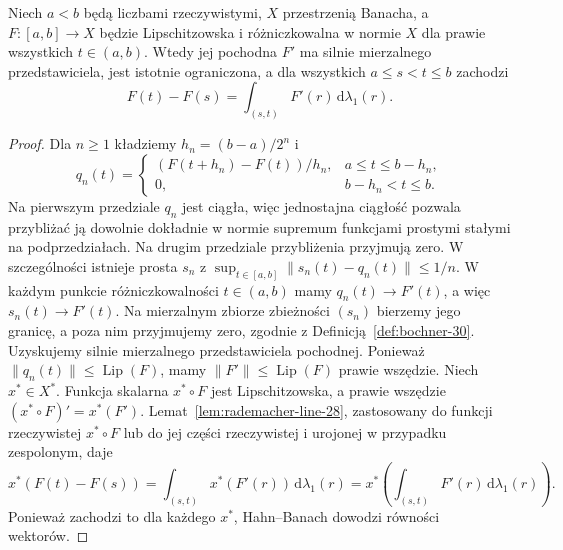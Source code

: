 \begin{lemat}
\label{lem:FTC-Banach-30}
Niech $a<b$ będą liczbami rzeczywistymi, $X$
przestrzenią Banacha, a $F:[a,b]\to X$ będzie Lipschitzowska i
różniczkowalna w normie $X$ dla prawie wszystkich
$t\in(a,b)$. Wtedy jej pochodna $F'$ ma silnie
mierzalnego przedstawiciela, jest istotnie ograniczona,
a dla wszystkich $a\le s<t\le b$ zachodzi
\[
 F(t)-F(s)=\int_{(s,t)}F'(r)\,\mathrm d\lambda_1(r).
\]
\end{lemat}
\begin{proof}
Dla $n\ge1$ kładziemy $h_n=(b-a)/2^n$ i
\[
 q_n(t)=
 \begin{cases}
 (F(t+h_n)-F(t))/h_n,&a\le t\le b-h_n,\\
 0,&b-h_n<t\le b.
 \end{cases}
\]
Na pierwszym przedziale $q_n$ jest ciągła,
więc jednostajna ciągłość pozwala przybliżać ją
dowolnie dokładnie w normie supremum funkcjami
prostymi stałymi na podprzedziałach.
Na drugim przedziale przybliżenia przyjmują zero.
W szczególności istnieje prosta $s_n$ z
$\sup_{t\in[a,b]}\|s_n(t)-q_n(t)\|\le1/n$.
W każdym punkcie różniczkowalności $t\in(a,b)$
mamy $q_n(t)\to F'(t)$, a więc $s_n(t)\to F'(t)$.
Na mierzalnym zbiorze zbieżności $(s_n)$ bierzemy
jego granicę, a poza nim przyjmujemy zero, zgodnie
z Definicją~\ref{def:bochner-30}. Uzyskujemy silnie
mierzalnego przedstawiciela pochodnej.
Ponieważ $\|q_n(t)\|\le\operatorname{Lip}(F)$,
mamy $\|F'\|\le\operatorname{Lip}(F)$ prawie wszędzie.
Niech $x^*\in X^*$. Funkcja skalarna
$x^*\circ F$ jest Lipschitzowska, a prawie wszędzie
$(x^*\circ F)'=x^*(F')$. Lemat~\ref{lem:rademacher-line-28}, zastosowany
do funkcji rzeczywistej $x^*\circ F$ lub do jej
części rzeczywistej i urojonej w przypadku zespolonym, daje
\[
 x^*(F(t)-F(s))
 =\int_{(s,t)}x^*(F'(r))\,\mathrm d\lambda_1(r)
 =x^*\!\left(\int_{(s,t)}F'(r)\,\mathrm d\lambda_1(r)\right).
\]
Ponieważ zachodzi to dla każdego $x^*$,
Hahn--Banach dowodzi równości wektorów.
\end{proof}

